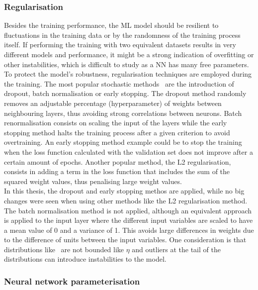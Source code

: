 \subsubsection{Regularisation}

Besides the training performance, the ML model should be resilient to fluctuations in the training data or by the randomness of the training process itself. If performing the training with two equivalent datasets results in very different models and performance, it might be a strong indication of overfitting or other instabilities, which is difficult to study as a NN has many free parameters.\\

To protect the model's robustness, regularisation techniques are employed during the training. The most popular stochastic methods~\cite{JMLR:v15:srivastava14a,batchnorm,earlystop} are the introduction of dropout, batch normalisation or early stopping. The dropout method randomly removes an adjustable percentage (hyperparameter) of weights between neighbouring layers, thus avoiding strong correlations between neurons. Batch renormalisation consists on scaling the input of the layers while the early stopping method halts the training process after a given criterion to avoid overtraining. An early stopping method example could be to stop the training when the loss function calculated with the validation set does not improve after a certain amount of epochs. Another popular method, the L2 regularisation, consists in adding a term in the loss function that includes the sum of the squared weight values, thus penalising large weight values.\\

In this thesis, the dropout and early stopping methos are applied, while no big changes were seen when using other methods like the L2 regularisation method. The batch normalisation method is not applied, although an equivalent approach is applied to the input layer where the different input variables are scaled to have a mean value of 0 and a variance of 1. This avoids large differences in weights due to the difference of units between the input variables. One consideration is that distributions like \pT\ are not bounded like $\eta$ and outliers at the tail of the distributions can introduce instabilities to the model.

\subsubsection{Neural network parameterisation}
\label{chapterML:PNN}

